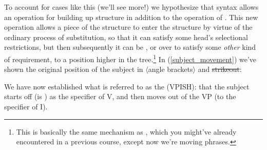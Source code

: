 \documentclass{article}
\begin{document}
To account for cases like this (we'll see more!) we hypothesize that syntax allows an operation for building up structure in addition to the operation of .
This new operation allows a piece of the structure to enter the structure by virtue of the ordinary process of substitution, so that it can satisfy some head's selectional restrictions, but then subsequently it can be , or  over to satisfy some \emph{other} kind of requirement, to a position higher in the tree.\footnote{This is basically the same mechanism as , which you might've already encountered in a previous course, except now we're moving phrases.}
In (\ref{subject_movement}) we've shown the original position of the subject in $\langle$angle brackets$\rangle$ and \sout{strikeout}:
\begin{exe}
    \label{subject_movement}
\end{exe}

We have now established what is referred to as the  (VPISH): that the subject starts off (is ) as the specifier of V, and then moves out of the VP (to the specifier of I).
\end{document}
